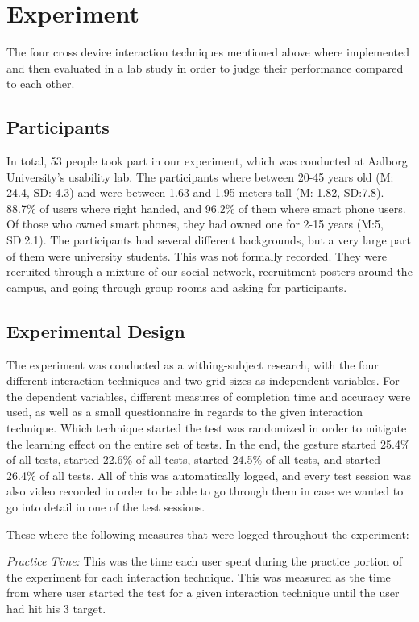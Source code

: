 \section{Experiment}
The four cross device interaction techniques mentioned above where implemented and then evaluated in a lab study in order to judge their performance compared to each other.

\subsection{Participants}
In total, 53 people took part in our experiment, which was conducted at Aalborg University's usability lab. The participants where between 20-45 years old (M: 24.4, SD: 4.3) and were between 1.63 and 1.95 meters tall (M: 1.82, SD:7.8). 88.7\% of users where right handed, and 96.2\% of them where smart phone users. Of those who owned smart phones, they had owned one for 2-15 years (M:5, SD:2.1). The participants had several different backgrounds, but a very large part of them were university students. This was not formally recorded. They were recruited through a mixture of our social network, recruitment posters around the campus, and going through group rooms and asking for participants. 

\subsection{Experimental Design}
The experiment was conducted as a withing-subject research, with the four different interaction techniques and two grid sizes as independent variables. For the dependent variables, different measures of completion time and accuracy were used, as well as a small questionnaire in regards to the given interaction technique. Which technique started the test was randomized in order to mitigate the learning effect on the entire set of tests. In the end, the \pinch gesture started 25.4\% of all tests, \swipe started 22.6\% of all tests, \throw started 24.5\% of all tests, and \tilt started 26.4\% of all tests. All of this was automatically logged, and every test session was also video recorded in order to be able to go through them in case we wanted to go into detail in one of the test sessions.

These where the following measures that were logged throughout the experiment: 

\textit{Practice Time:} This was the time each user spent during the practice portion of the experiment for each interaction technique. This was measured as the time from where user started the test for a given interaction technique until the user had hit his 3 target. 

